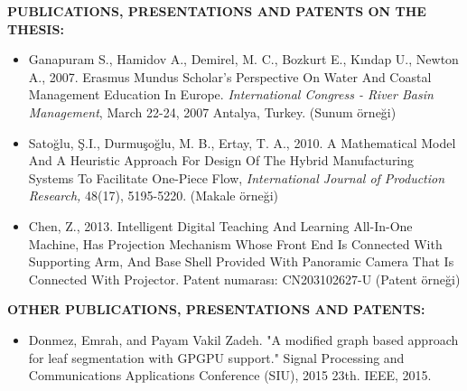 \textbf{PUBLICATIONS, PRESENTATIONS AND PATENTS ON THE THESIS:} 
\vspace{-3mm}
\begin{itemize}
   \item Ganapuram S., Hamidov A., Demirel, M. C., Bozkurt E., Kındap U., Newton A.,
   2007. Erasmus Mundus Scholar's Perspective On Water And Coastal
   Management Education In Europe. 
   \textit{International Congress - River Basin Management}, 
   March 22-24, 2007 Antalya, Turkey. (Sunum örneği)

   \item Satoğlu, Ş.I., Durmuşoğlu, M. B., Ertay, T. A., 2010. A Mathematical Model 
   And A Heuristic Approach For Design Of The Hybrid Manufacturing Systems 
   To Facilitate One-Piece Flow, 
   \textit{International Journal of Production Research,}
   48(17), 5195-5220. (Makale örneği)


   \item  Chen, Z., 2013. Intelligent Digital Teaching And Learning All-In-One Machine,
   Has Projection Mechanism Whose Front End Is Connected With Supporting
   Arm, And Base Shell Provided With Panoramic Camera That Is Connected With
   Projector. Patent numarası: CN203102627-U (Patent örneği)
\end{itemize}

\newpage

\textbf{OTHER PUBLICATIONS, PRESENTATIONS AND PATENTS:} 
\begin{itemize}
	\item Donmez, Emrah, and Payam Vakil Zadeh. "A modified graph 	based approach for leaf segmentation with GPGPU support." Signal Processing and Communications Applications Conference (SIU), 2015 23th. IEEE, 2015.
\end{itemize}

\vspace{-3mm}
